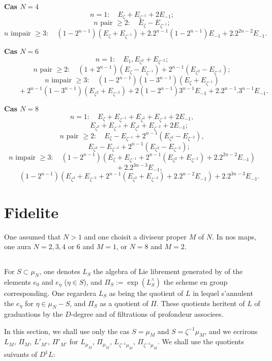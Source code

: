 \documentclass[11pt,a4paper]{article}
\theoremstyle{plain}
\theoremstyle{definition}
\begin{document}
\medskip
\noindent\textbf{Cas $N=4$}
\[
n=1: \quad E_\zeta + E_{\zeta^{-1}} + 2E_{-1};
\]
\[
n \text{ pair } \geq 2: \quad E_\zeta - E_{\zeta^{-1}};
\]
\[
n \text{ impair } \geq 3: \quad (1-2^{n-1})(E_\zeta + E_{\zeta^{-1}}) + 2.2^{n-1}(1-2^{n-1})E_{-1} + 2.2^{2n-2}E_{-1}.
\]

\medskip
\noindent\textbf{Cas $N=6$}
\[
n=1: \quad E_1, E_{\zeta^2} + E_{\zeta^{-2}};
\]
\[
n \text{ pair } \geq 2: \quad (1+2^{n-1})(E_\zeta - E_{\zeta^{-1}}) + 2^{n-1}(E_{\zeta^2} - E_{\zeta^{-2}});
\]
\[
n \text{ impair } \geq 3: \quad (1-2^{n-1})(1-3^{n-1})(E_\zeta + E_{\zeta^{-1}})
\]
\[
\qquad + 2^{n-1}(1-3^{n-1})(E_{\zeta^2} + E_{\zeta^{-2}}) + 2(1-2^{n-1})3^{n-1}E_{-1} + 2.2^{n-1}.3^{n-1}E_{-1}.
\]

\medskip
\noindent\textbf{Cas $N=8$}
\[
n=1: \quad E_\zeta + E_{\zeta^{-1}} + E_{\zeta^2} + E_{\zeta^{-2}} + 2E_{-1},
\]
\[
\qquad E_{\zeta^3} + E_{\zeta^{-3}} + E_{\zeta^2} + E_{\zeta^{-2}} + 2E_{-1};
\]
\[
n \text{ pair } \geq 2: \quad E_\zeta - E_{\zeta^{-1}} + 2^{n-1}(E_{\zeta^2} - E_{\zeta^{-2}}),
\]
\[
\qquad E_{\zeta^3} - E_{\zeta^{-3}} + 2^{n-1}(E_{\zeta^2} - E_{\zeta^{-2}});
\]
\[
n \text{ impair } \geq 3: \quad (1-2^{n-1})(E_\zeta + E_{\zeta^{-1}} + 2^{n-1}(E_{\zeta^2} + E_{\zeta^{-2}}) + 2.2^{2n-2}E_{-1})
\]
\[
\qquad + 2.2^{3n-3}E_{-1},
\]
\[
\qquad (1-2^{n-1})(E_{\zeta^3} + E_{\zeta^{-3}} + 2^{n-1}(E_{\zeta^2} + E_{\zeta^{-2}}) + 2.2^{n-2}E_{-1}) + 2.2^{3n-3}E_{-1}.
\]

\section{Fidelite}
\label{sec:4}

One assumed that $N > 1$ and one choisit a diviseur proper $M$ of $N$. In nos maps, one aura $N = 2,3,4$ or $6$ and $M = 1$, or $N = 8$ and $M = 2$.

\subsection{}
For $S \subset \mu_N$, one denotes $L_S$ the algebra of Lie librement generated by of the elements $e_0$ and $e_\eta$ ($\eta \in S$), and $\Pi_S := \exp(L_S^{\wedge})$ the scheme en group corresponding. One regardera $L_S$ as being the quotient of $L$ in lequel s'annulent the $e_\eta$ for $\eta \in \mu_N - S$, and $\Pi_S$ as a quotient of $\Pi$. These quotients heritent of $L$ of graduations by the $D$-degree and of filtrations of profondeur associees.

In this section, we shall use only the cas $S = \mu_M$ and $S = \zeta^{-1} \mu_M$, and we ecrirons $L_M$, $\Pi_M$, $L'_{M'}$, $\Pi'_{M'}$ for $L_{\mu_M}$, $\Pi_{\mu_M}$, $L_{\zeta^{-1}\mu_M}$, $\Pi_{\zeta^{-1}\mu_M}$. We shall use the quotients suivants of $D^1L$:
\end{document}
